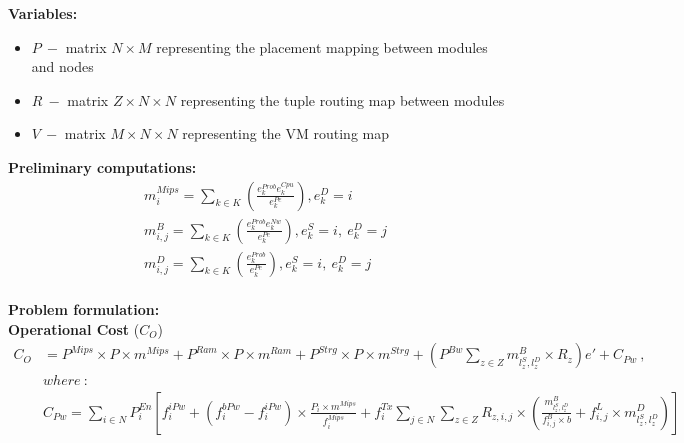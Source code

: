 \documentclass{article}
\begin{document}
\pagebreak
\noindent\textbf{Variables:}
\begin{itemize}
	\item $P~-$ matrix $N\times M$ representing the placement mapping between modules and nodes
	\item $R~-$ matrix $Z\times N\times N$ representing the tuple routing map between modules
	\item $V~-$ matrix $M\times N\times N$ representing the VM routing map
\end{itemize}
\vspace*{12pt}

\noindent\textbf{Preliminary computations:}\\[6pt]
\begin{equation*}
\begin{split}
& m^{Mips}_{i} = \sum_{k\in K} \left(\frac{e^{Prob}_k e^{Cpu}_k}{e^{Pe}_k}\right), e_k^{D} = i\\[6pt]
& m^B_{i,j}= \sum_{k\in K} \left(\frac{e^{Prob}_k e^{Nw}_k}{e^{Pe}_k}\right), e^{S}_k = i,~e^{D}_k = j\\[6pt]
& m^D_{i,j}= \sum_{k\in K} \left(\frac{e^{Prob}_k}{e^{Pe}_k}\right), e^{S}_k = i,~e^{D}_k = j
\end{split}
\end{equation*}\\[6pt]

\noindent\textbf{Problem formulation:}\\[12pt]
\noindent\textbf{Operational Cost} ($C_O$)\\[6pt]
\begin{equation*}
\begin{aligned}
	C_O & = P^{Mips} \times P \times m^{Mips} + P^{Ram} \times P \times m^{Ram} + P^{Strg}\times P\times m^{Strg} + \left(P^{Bw} \sum_{z\in Z} m^B_{l^S_z,l^D_z} \times R_z\right)e' + C_{Pw}~,\\
	& where~ :\\
	& C_{Pw} = \sum_{i\in N} P^{En}_i \left[ f_i^{iPw} + (f_i^{bPw} - f_i^{iPw}) \times\frac{P_i \times m^{Mips}}{f_i^{Mips}} + f^{Tx}_{i} \sum_{j\in N}\sum_{z\in Z} R_{z, i,j} \times \left(\frac{ m^B_{l^S_z,l^D_z}}{f^B_{i,j}\times b} + f^L_{i,j} \times m^D_{l_z^S, l_z^D} \right) \right]
\end{aligned}
\end{equation*}\\[6pt]

\pagebreak
\end{document}
